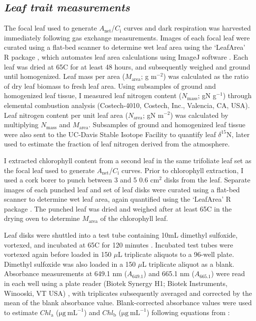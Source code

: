 \subsection{\textit{Leaf trait measurements}}
\noindent The focal leaf used to generate $A_\mathrm{net}$/$C_\mathrm{i}$ curves and dark respiration was harvested immediately following gas exchange measurements. Images of each focal leaf were curated using a flat-bed scanner to determine wet leaf area using the `LeafArea' R package , which automates leaf area calculations using ImageJ software . Each leaf was dried at 65\textdegree{}C for at least 48 hours, and subsequently weighed and ground until homogenized. Leaf mass per area ($M_\mathrm{area}$; g m$^{-2}$) was calculated as the ratio of dry leaf biomass to fresh leaf area. Using subsamples of ground and homogenized leaf tissue, I measured leaf nitrogen content ($N_\mathrm{mass}$; gN g$^{-1}$) through elemental combustion analysis (Costech-4010, Costech, Inc., Valencia, CA, USA). Leaf nitrogen content per unit leaf area ($N_\mathrm{area}$; gN m$^{-2}$) was calculated by multiplying $N_\mathrm{mass}$ and $M_\mathrm{area}$. Subsamples of ground and homogenized leaf tissue were also sent to the UC-Davis Stable Isotope Facility to quantify leaf $\delta^{15}$N, later used to estimate the fraction of leaf nitrogen derived from the atmosphere.

I extracted chlorophyll content from a second leaf in the same trifoliate leaf set as the focal leaf used to generate $A_\mathrm{net}$/$C_\mathrm{i}$ curves. Prior to chlorophyll extraction, I used a cork borer to punch between 3 and 5 0.6 cm$^2$ disks from the leaf. Separate images of each punched leaf and set of leaf disks were curated using a flat-bed scanner to determine wet leaf area, again quantified using the `LeafArea' R package . The punched leaf was dried and weighed after at least 65\textdegree{}C in the drying oven to determine $M_\mathrm{area}$ of the chlorophyll leaf.
    
Leaf disks were shuttled into a test tube containing 10mL dimethyl sulfoxide, vortexed, and incubated at 65\textdegree{}C for 120 minutes . Incubated test tubes were vortexed again before loaded in 150 $\mu$L triplicate aliquots to a 96-well plate. Dimethyl sulfoxide was also loaded in a 150 $\mu$L triplicate aliquot as a blank. Absorbance measurements at 649.1 nm ($A_{649.1}$) and 665.1 nm ($A_{665.1}$) were read in each well using a plate reader (Biotek Synergy H1; Biotek Instruments, Winooski, VT USA) , with triplicates subsequently averaged and corrected by the mean of the blank absorbance value. Blank-corrected absorbance values were used to estimate $Chl_\mathrm{a}$ ($\mathrm{\mu g\ mL^{-1}}$) and $Chl_\mathrm{b}$ ($\mathrm{\mu g\ mL^{-1}}$) following equations from :

